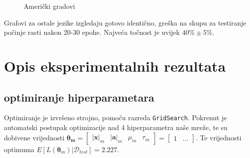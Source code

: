 \documentclass[conference]{IEEEtran}
\begin{document}
\begin{figure}[H]
\centering
{}
\caption{Američki gradovi}
\end{figure}
Grafovi za ostale jezike izgledaju gotovo identično, greška na skupu za testiranje počinje rasti nakon 20-30 epohe. Najveća točnost je uvijek $40\% \pm 5\%$.

\section{Opis eksperimentalnih rezultata} 
\subsection{optimiranje hiperparametara}
Optimiranje je izvršeno strojno, pomoću razreda \texttt{GridSearch}.
Pokrenut je automatski postupak optimizacije nad 4 hiperparametra naše mreže, te su dobivene vrijednosti $\mathbf{\boldsymbol{\theta}_m} = \begin{bmatrix} \lvert \mathbf{x} \rvert_m & \lvert \mathbf{a} \rvert_m & \mu_m & \tau_m \end{bmatrix} = \begin{bmatrix} 1 & ... \end{bmatrix}$.
Te vrijednosti optimuma $E[L(\mathbf{\boldsymbol{\theta}}_m) | \mathcal{D}_{test}] = 2.227$.
\end{document}
